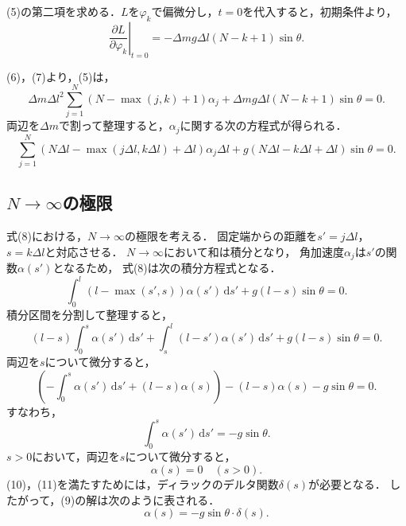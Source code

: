 \documentclass[11pt, a4paper]{ltjsarticle}
\begin{document}
(5)の第二項を求める．$L$を$\varphi_k$で偏微分し，$t = 0$を代入すると，初期条件より，
\begin{equation}
  \left.\frac{\partial L}{\partial \varphi_k}\right|_{t = 0}
  = - \varDelta m g \varDelta l \left(N - k + 1\right) \sin \theta.
\end{equation}

(6)，(7)より，(5)は，
\begin{equation*}
  \varDelta m {\varDelta l}^2 \sum_{j = 1}^{N}
  \left(N - \max \left(j, k\right) + 1\right) \alpha_j
  + \varDelta m g \varDelta l \left(N - k + 1\right) \sin \theta = 0.
\end{equation*}
両辺を$\varDelta m$で割って整理すると，$\alpha_j$に関する次の方程式が得られる．
\begin{equation}
  \sum_{j = 1}^{N} \left(N \varDelta l
  - \max \left(j \varDelta l, k \varDelta l\right) + \varDelta l\right) \alpha_j
  \varDelta l + g \left(N \varDelta l - k \varDelta l + \varDelta l\right) \sin \theta = 0.
\end{equation}

\subsection{$N \rightarrow \infty$の極限}
式(8)における，$N \rightarrow \infty$の極限を考える．
固定端からの距離を$s' = j \varDelta l$，$s = k \varDelta l$と対応させる．
$N \rightarrow \infty$において和は積分となり，
角加速度$\alpha_j$は$s'$の関数$\alpha\left(s'\right)$となるため，
式(8)は次の積分方程式となる．
\begin{equation}
  \int_{0}^{l} \left(l - \max \left(s', s\right)\right)
  \alpha\left(s'\right) \,\mathrm{d}s'
  + g \left(l - s\right) \sin \theta = 0. 
\end{equation}
積分区間を分割して整理すると，
\begin{equation*}
  \left(l - s\right) \int_{0}^{s} \alpha\left(s'\right) \,\mathrm{d}s'
  + \int_{s}^{l} \left(l - s'\right) \alpha\left(s'\right) \,\mathrm{d}s'
  + g \left(l - s\right) \sin \theta = 0.
\end{equation*}
両辺を$s$について微分すると，
\begin{equation*}
  \left( - \int_{0}^{s} \alpha\left(s'\right) \,\mathrm{d}s'
  + \left(l - s\right) \alpha\left(s\right) \right)
  - \left(l - s\right) \alpha\left(s\right)
  - g \sin \theta = 0.
\end{equation*}
すなわち，
\begin{equation}
  \int_{0}^{s} \alpha\left(s'\right) \,\mathrm{d}s' = -g \sin \theta.
\end{equation}
$s > 0$において，両辺を$s$について微分すると，
\begin{equation}
  \alpha\left(s\right) = 0 \quad \left(s > 0\right).
\end{equation}
(10)，(11)を満たすためには，ディラックのデルタ関数$\delta \left(s\right)$が必要となる．
したがって，(9)の解は次のように表される．
\begin{equation}
  \alpha\left(s\right) = -g \sin \theta \cdot \delta \left(s\right).
\end{equation}
\end{document}

